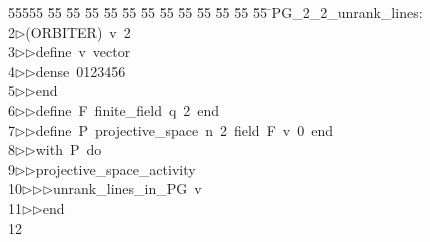 %
%
\begin{tabbing}
55555 \= 55 \= 55 \= 55 \= 55 \= 55 \= 55 \= 55 \= 55 \= 55 \= 55 \= 55 \= 55 \= \>PG\_2\_2\_unrank\_lines:\\[0pt]
2\>$\triangleright$\>(ORBITER)\ v\ 2\ \\[0pt]
3\>$\triangleright$\>$\triangleright$\>define\ v\ vector\ \\[0pt]
4\>$\triangleright$\>$\triangleright$\>dense\ 0123456\ \\[0pt]
5\>$\triangleright$\>$\triangleright$\>end\ \\[0pt]
6\>$\triangleright$\>$\triangleright$\>define\ F\ finite\_field\ q\ 2\ end\ \\[0pt]
7\>$\triangleright$\>$\triangleright$\>define\ P\ projective\_space\ n\ 2\ field\ F\ v\ 0\ end\ \\[0pt]
8\>$\triangleright$\>$\triangleright$\>with\ P\ do\ \\[0pt]
9\>$\triangleright$\>$\triangleright$\>projective\_space\_activity\ \\[0pt]
10\>$\triangleright$\>$\triangleright$\>$\triangleright$\>unrank\_lines\_in\_PG\ v\ \\[0pt]
11\>$\triangleright$\>$\triangleright$\>end\ \\[0pt]
12\>\end{tabbing}
